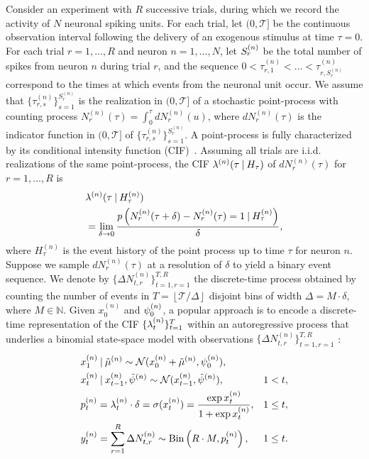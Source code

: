 \documentclass[twoside]{article}
\begin{document}
Consider an experiment with $R$ successive trials, during which we record the activity of $N$ neuronal spiking units. For each trial, let $(0, \mathcal{T}]$ be the continuous observation interval following the delivery of an exogenous stimulus at time $\tau = 0$. For each trial $r = 1, \ldots, R$ and neuron $n = 1, \ldots, N$, let $\idx[r] S n$ be the total number of spikes from neuron $n$ during trial $r$, and the sequence $0 < \tau^{(n)}_{r,1}<\ldots < \tau^{(n)}_{r,S_r^{(n)}}$ correspond to the times at which events from the neuronal unit occur. We assume that {{$\{\tau^{(n)}_{r,s}\}_{s=1}^{S_r^{(n)}}$}} is the realization in $(0, \mathcal{T}] $ of a stochastic point-process with counting process $N_r^{(n)}(\tau) = \int_{0}^\tau dN_r^{(n)}(u)$, %
where $dN_r^{(n)}(\tau)$ is the indicator function in $(0, \mathcal{T}]$ of {{$\{\tau^{(n)}_{r,s}\}_{s=1}^{S_r^{(n)}}$}}. A point-process is fully characterized by its conditional intensity function (CIF)~\citep{vere2003introduction}. Assuming all trials are i.i.d. realizations of the same point-process, the CIF $\lambda^{(n)}(\tau \given H_\tau)$ of $dN_r^{(n)}(\tau)$ for $r = 1, \ldots, R$ is
\begin{align}
	&\lambda^{(n)}(\tau \given H_\tau^{(n)})  \\ \nonumber
	&=\lim_{\delta \rightarrow 0} \frac{p\left(N_r^{(n)}(\tau+\delta)-N_r^{(n)}(\tau)=1 \given H_\tau^{(n)}\right)}{\delta},
\end{align}
where $H_\tau^{(n)}$ is the event history of the point process up to time $\tau$ for neuron $n$.   Suppose we sample $dN_r^{(n)}(\tau)$ at a resolution of $\delta$ to yield a binary event sequence.  We denote by $\{\Delta N_{t,r}^{(n)}\}_{t=1,r=1}^{T,R}$ the discrete-time process obtained by counting the number of events in $T =  \left\lfloor \mathcal{T} / \Delta \right \rfloor$ disjoint bins of width $\Delta = M \cdot \delta$, where $M \in \mathbb{N}$.  Given $x_0^{(n)}$ and  $\idx[0] \psi n$, a popular approach is to encode a discrete-time representation of the CIF $\{\idx[t] \lambda n\}_{t=1}^T$ within an autoregressive process that underlies a binomial state-space model with observations {{$\{\Delta N_{t,r}^{(n)}\}_{t=1,r=1}^{T,R}$}} \citep{smith2003estimating}: 
\begin{align}
	 &x_1^{(n)} \given \idx \tmu n \sim \mathcal{N}(x_0^{(n)} + \idx \tmu n, \idx[0] \psi n), \label{bssm} \\ 
	  &x_t^{(n)} \given x_{t-1}^{(n)}, \tilde{\psi}^{(n)} \sim \mathcal{N} (x_{t-1}^{(n)}, \tpsi^{(n)}),  &1 < t, \nonumber \\ 
       &\idx[t] p n = \idx[t] \lambda n \cdot \delta = \sigma( \idx[t] x n) = \frac{\exp {x_t^{(n)}}}{1+ \exp {x_t^{(n)}}}, &1 \leq t, \nonumber \\
     & y_t^{(n)}  = \sum\limits_{r=1}^R  \Delta N_{t,r}^{(n)} \sim \text{Bin}\left(R \cdot M, \idx[t] p n\right) , &1 \leq t \nonumber.
\end{align}
\end{document}
